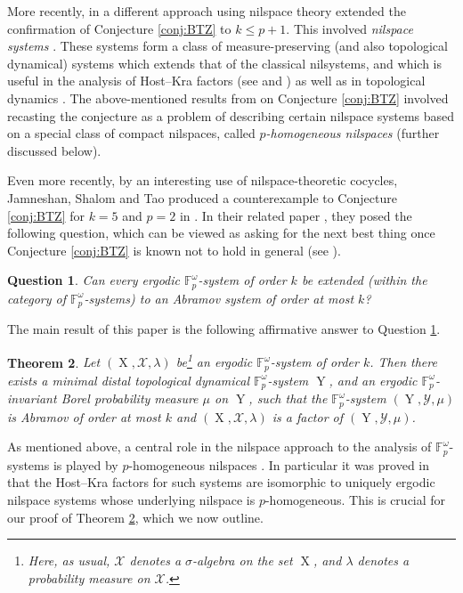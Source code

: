 \documentclass[a4paper,12pt,reqno]{amsart}
\newtheorem{theorem}{Theorem}[section]
\newtheorem{question}[theorem]{Question}
\theoremstyle{definition}
\newcommand{\mc}{\mathcal}
\newcommand{\mb}{\mathbb}
\DeclareMathOperator{\ns}{X}
\DeclareMathOperator{\nss}{Y}
\begin{document}
More recently, in \cite{CGSS-p-hom} a different approach using nilspace theory extended the confirmation of Conjecture \ref{conj:BTZ} to $k\leq p+1$. This involved \emph{nilspace systems} \cite[Definition 5.10]{CScouplings}. These systems form a class of measure-preserving (and also topological dynamical) systems which extends that of the classical nilsystems, and which is useful in the analysis of Host--Kra factors (see \cite[Theorem  5.11]{CScouplings} and \cite[Theorem 5.1]{CGSS}) as well as in topological dynamics \cite{GMV3}. The above-mentioned results from \cite{CGSS-p-hom} on Conjecture \ref{conj:BTZ} involved recasting the conjecture as a problem of describing certain nilspace systems based on a special class of compact nilspaces, called \emph{$p$-homogeneous nilspaces} (further discussed below).

Even more recently, by an interesting use of nilspace-theoretic cocycles, Jamneshan, Shalom and Tao produced a counterexample to Conjecture \ref{conj:BTZ} for $k=5$ and $p=2$ in \cite{JST2}. In their related paper \cite{JST1}, they posed the following question, which can be viewed as asking for the next best thing once Conjecture \ref{conj:BTZ} is known not to hold in general (see \cite[Question 1.6]{JST1}). 

\begin{question}\label{Q:JST}
Can every ergodic $\mb{F}_p^\omega$-system of order $k$ be extended \textup{(}within the category of $\mb{F}_p^\omega$-systems\textup{)} to an Abramov system of order at most $k$?    
\end{question}

\noindent The main result of this paper is the following affirmative answer to Question \ref{Q:JST}.

\begin{theorem}\label{thm:main-intro}
Let $(\ns,\mc{X},\lambda)$ be\footnote{Here, as usual, $\mc{X}$ denotes a $\sigma$-algebra on the set $\ns$, and $\lambda$ denotes a probability measure on $\mc{X}$.} an ergodic $\mb{F}_p^\omega$-system of order $k$. Then there exists a minimal distal topological dynamical $\mb{F}_p^\omega$-system $\nss$,  and an ergodic $\mb{F}_p^\omega$-invariant Borel probability measure $\mu$ on $\nss$, such that the $\mb{F}_p^\omega$-system $(\nss,\mc{Y},\mu)$ is Abramov of order at most $k$ and $(\ns,\mc{X},\lambda)$ is a factor of $(\nss,\mc{Y},\mu)$. 
\end{theorem}
\noindent As mentioned above, a central role in the nilspace approach to the analysis of $\mb{F}_p^\omega$-systems is played by $p$-homogeneous nilspaces \cite[Definition 1.2]{CGSS-p-hom}. In particular it was proved in \cite[Theorem 5.3]{CGSS-p-hom} that the Host--Kra factors for such systems are isomorphic to uniquely ergodic nilspace systems whose underlying nilspace is $p$-homogeneous. This is crucial for our proof of Theorem \ref{thm:main-intro}, which we now outline.
\end{document}
